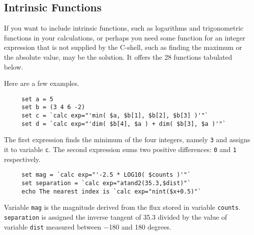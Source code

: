 \newpage
\subsection{Intrinsic Functions
\label{sc4_se_intrinsic}}

If you want to include intrinsic functions, such as logarithms and
trigonometric functions in your calculations, or perhaps you need some
function for an integer expression that is not supplied by the
C-shell, such as finding the maximum or the absolute value,
 may be the solution.  It offers the
28 functions tabulated below.

Here are a few examples.

\small
\begin{verbatim}
     set a = 5
     set b = (3 4 6 -2)
     set c = `calc exp="'min( $a, $b[1], $b[2], $b[3] )'"`
     set d = `calc exp="'dim( $b[4], $a ) + dim( $b[3], $a )'"`
\end{verbatim}
\normalsize
The first expression finds the minimum of the four integers, namely
{\tt 3} and assigns it to variable {\tt c}.  The second expression
sums two positive differences: {\tt 0} and {\tt 1} respectively.

\small
\begin{verbatim}
     set mag = `calc exp="'-2.5 * LOG10( $counts )'"`
     set separation = `calc exp="atand2(35.3,$dist)"`
     echo The nearest index is `calc exp="nint($x+0.5)"`
\end{verbatim}
\normalsize
Variable {\tt mag} is the magnitude derived from the flux
stored in variable {\tt counts}.  {\tt separation} is assigned
the inverse tangent of 35.3 divided by the value of variable
{\tt dist} measured between $-$180 and 180 degrees. 

\bigskip


